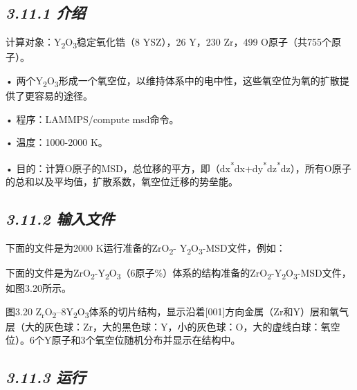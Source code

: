 \hypertarget{ux4ecbux7ecd-2}{%
\subsection{\texorpdfstring{\emph{3.11.1
介绍}}{3.11.1 介绍}}\label{ux4ecbux7ecd-2}}

计算对象：Y\textsubscript{2}O\textsubscript{3}稳定氧化锆（8 YSZ），26
Y，230 Zr，499 O原子（共755个原子）。

•
两个Y\textsubscript{2}O\textsubscript{3}形成一个氧空位，以维持体系中的电中性，这些氧空位为氧的扩散提供了更容易的途径。

• 程序：LAMMPS/compute msd命令。

• 温度：1000-2000 K。

•
目的：计算O原子的MSD，总位移的平方，即（dx\textsuperscript{*}dx+dy\textsuperscript{*}dz\textsuperscript{*}dz），所有O原子的总和以及平均值，扩散系数，氧空位迁移的势垒能。

\hypertarget{ux8f93ux5165ux6587ux4ef6-9}{%
\subsection{\texorpdfstring{\emph{3.11.2
输入文件}}{3.11.2 输入文件}}\label{ux8f93ux5165ux6587ux4ef6-9}}

下面的文件是为2000 K运行准备的ZrO\textsubscript{2}-
Y\textsubscript{2}O\textsubscript{3}-MSD文件，例如：



下面的文件是为ZrO\textsubscript{2}-Y\textsubscript{2}O\textsubscript{3}（6原子\%）体系的结构准备的ZrO\textsubscript{2}-Y\textsubscript{2}O\textsubscript{3}-MSD文件，如图3.20所示。


图3.20
Z\textsubscript{r}O\textsubscript{2}--8Y\textsubscript{2}O\textsubscript{3}体系的切片结构，显示沿着{[}001{]}方向金属（Zr和Y）层和氧气层（大的灰色球：Zr，大的黑色球：Y，小的灰色球：O，大的虚线白球：氧空位）。6个Y原子和3个氧空位随机分布并显示在结构中。


\hypertarget{ux8fd0ux884c-2}{%
\subsection{\texorpdfstring{\emph{3.11.3
运行}}{3.11.3 运行}}\label{ux8fd0ux884c-2}}

